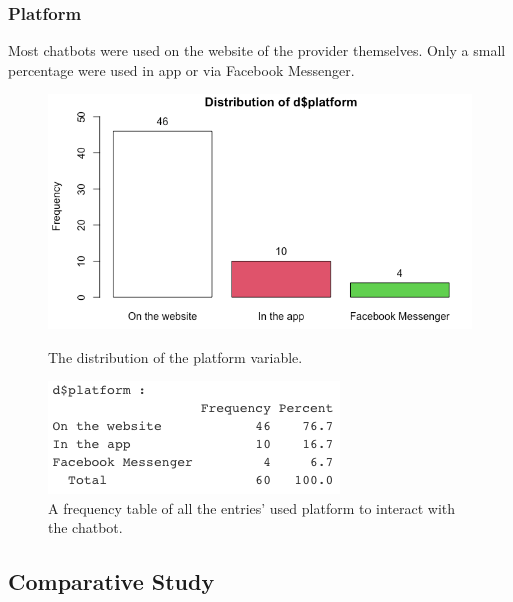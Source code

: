 \subsubsection{Platform}
Most chatbots were used on the website of the provider themselves. Only a small percentage were used in app or via Facebook Messenger.
\begin{figure}[!htb]
	\includegraphics[width=\linewidth]{../LaTeX/Figures/Environments/PlatformPlot.png}
	\caption{The distribution of the platform variable.}\label{fig:platformPlot}
	\endminipage\hfill
	\includegraphics[width=\linewidth]{../LaTeX/Figures/Environments/PlatformFreq.png}
	\caption{A frequency table of all the entries' used platform to interact with the chatbot.}\label{fig:platformFreq}
	\endminipage\hfill
\end{figure}

\subsection{Comparative Study}
